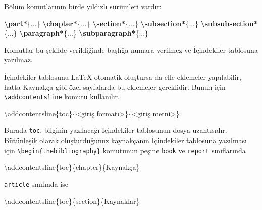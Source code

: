 \documentclass[
  10pt,
]{scrbook}
\newenvironment{Shaded}{\begin{snugshade}}{\end{snugshade}}
\newcommand{\FunctionTok}[1]{\textcolor[rgb]{0.00,0.00,0.00}{#1}}
\newcommand{\KeywordTok}[1]{\textcolor[rgb]{0.13,0.29,0.53}{\textbf{#1}}}
\newcommand{\NormalTok}[1]{#1}
\theoremstyle{definition}
\theoremstyle{definition}
\theoremstyle{definition}
\theoremstyle{definition}
\theoremstyle{remark}
\begin{document}
Bölüm komutlarının birde yıldızlı sürümleri vardır:

\begin{Shaded}
\begin{Highlighting}[]
\KeywordTok{\textbackslash{}part*}\NormalTok{\{...\}}
\KeywordTok{\textbackslash{}chapter*}\NormalTok{\{...\}}
\KeywordTok{\textbackslash{}section*}\NormalTok{\{...\}}
\KeywordTok{\textbackslash{}subsection*}\NormalTok{\{...\}}
\KeywordTok{\textbackslash{}subsubsection*}\NormalTok{\{...\}}
\KeywordTok{\textbackslash{}paragraph*}\NormalTok{\{...\}}
\KeywordTok{\textbackslash{}subparagraph*}\NormalTok{\{...\}}
\end{Highlighting}
\end{Shaded}

Komutlar bu şekilde verildiğinde başlığa numara verilmez ve İçindekiler tablosuna yazılmaz.

İçindekiler tablosunu LaTeX otomatik oluştursa da elle eklemeler yapılabilir, hatta Kaynakça gibi özel sayfalarda bu eklemeler gereklidir. Bunun için \texttt{\textbackslash{}addcontentsline} komutu kullanılır.

\begin{Shaded}
\begin{Highlighting}[]
\FunctionTok{\textbackslash{}addcontentsline}\NormalTok{\{toc\}\{\textless{}giriş formatı\textgreater{}\}\{\textless{}giriş metni\textgreater{}\}}
\end{Highlighting}
\end{Shaded}

Burada \texttt{toc}, bilginin yazılacağı İçindekiler tablosunun dosya uzantısıdır. Bütünleşik olarak oluşturduğunuz kaynakçanın İçindekiler tablosuna yazılması için \texttt{\textbackslash{}begin\{thebibliography\}} komutunun peşine \texttt{book} ve \texttt{report} sınıflarında

\begin{Shaded}
\begin{Highlighting}[]
\FunctionTok{\textbackslash{}addcontentsline}\NormalTok{\{toc\}\{chapter\}\{Kaynakça\}}
\end{Highlighting}
\end{Shaded}

\texttt{article} sınıfında ise

\begin{Shaded}
\begin{Highlighting}[]
\FunctionTok{\textbackslash{}addcontentsline}\NormalTok{\{toc\}\{section\}\{Kaynaklar\}}
\end{Highlighting}
\end{Shaded}
\end{document}
